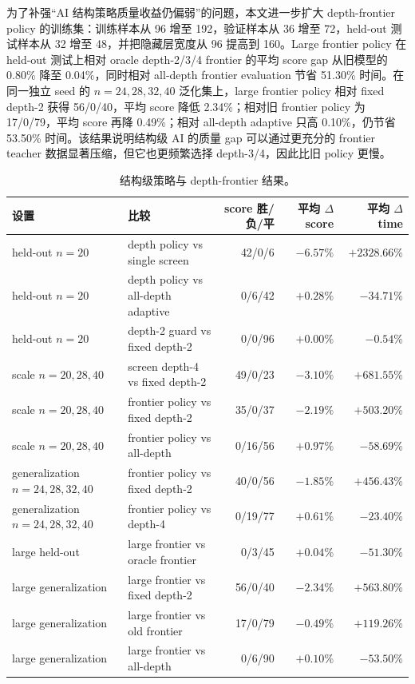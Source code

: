 \documentclass[UTF8,fontset=macnew,11pt]{ctexart}
\begin{document}
为了补强“AI 结构策略质量收益仍偏弱”的问题，本文进一步扩大 depth-frontier policy 的训练集：训练样本从 96 增至 192，验证样本从 36 增至 72，held-out 测试样本从 32 增至 48，并把隐藏层宽度从 96 提高到 160。Large frontier policy 在 held-out 测试上相对 oracle depth-2/3/4 frontier 的平均 score gap 从旧模型的 0.80\% 降至 0.04\%，同时相对 all-depth frontier evaluation 节省 51.30\% 时间。在同一独立 seed 的 $n=24,28,32,40$ 泛化集上，large frontier policy 相对 fixed depth-2 获得 56/0/40，平均 score 降低 2.34\%；相对旧 frontier policy 为 17/0/79，平均 score 再降 0.49\%；相对 all-depth adaptive 只高 0.10\%，仍节省 53.50\% 时间。该结果说明结构级 AI 的质量 gap 可以通过更充分的 frontier teacher 数据显著压缩，但它也更频繁选择 depth-3/4，因此比旧 policy 更慢。

\begin{table}[H]
\centering
\scriptsize
\caption{结构级策略与 depth-frontier 结果。}
\label{tab:policy}
\begin{tabular}{llrrr}
\toprule
设置 & 比较 & score 胜/负/平 & 平均 $\Delta$ score & 平均 $\Delta$ time \\
\midrule
held-out $n=20$ & depth policy vs single screen & 42/0/6 & $-6.57\%$ & $+2328.66\%$ \\
held-out $n=20$ & depth policy vs all-depth adaptive & 0/6/42 & $+0.28\%$ & $-34.71\%$ \\
held-out $n=20$ & depth-2 guard vs fixed depth-2 & 0/0/96 & $+0.00\%$ & $-0.54\%$ \\
scale $n=20,28,40$ & screen depth-4 vs fixed depth-2 & 49/0/23 & $-3.10\%$ & $+681.55\%$ \\
scale $n=20,28,40$ & frontier policy vs fixed depth-2 & 35/0/37 & $-2.19\%$ & $+503.20\%$ \\
scale $n=20,28,40$ & frontier policy vs all-depth & 0/16/56 & $+0.97\%$ & $-58.69\%$ \\
generalization $n=24,28,32,40$ & frontier policy vs fixed depth-2 & 40/0/56 & $-1.85\%$ & $+456.43\%$ \\
generalization $n=24,28,32,40$ & frontier policy vs depth-4 & 0/19/77 & $+0.61\%$ & $-23.40\%$ \\
large held-out & large frontier vs oracle frontier & 0/3/45 & $+0.04\%$ & $-51.30\%$ \\
large generalization & large frontier vs fixed depth-2 & 56/0/40 & $-2.34\%$ & $+563.80\%$ \\
large generalization & large frontier vs old frontier & 17/0/79 & $-0.49\%$ & $+119.26\%$ \\
large generalization & large frontier vs all-depth & 0/6/90 & $+0.10\%$ & $-53.50\%$ \\
\bottomrule
\end{tabular}
\end{table}
\end{document}
